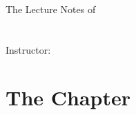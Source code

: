 \documentclass[10pt,letterpaper]{report}
\begin{document}
\begin{titlepage}
\begin{center}
  \textsc{\Large \theUniversity}\\[0.5cm]
  \textsc{\theDepartment}\\[6.0cm]
  \Large The Lecture Notes of\\
  \huge \theCourseNumber\;\;\textbf{\theCourseTitle}\\[0.5cm]
  \Large \theDate\\[10.0cm] %
  Instructor: \theInstructor
\end{center}
\end{titlepage}
\chapter{The Chapter}
\end{document}
